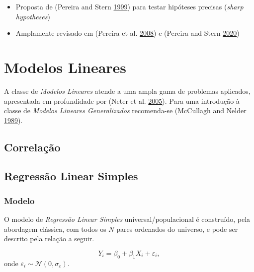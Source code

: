 \documentclass[
]{book}
\providecommand{\tightlist}{%
  \setlength{\itemsep}{0pt}\setlength{\parskip}{0pt}}
\theoremstyle{definition}
\theoremstyle{definition}
\theoremstyle{definition}
\theoremstyle{remark}
\begin{document}
\begin{itemize}
\tightlist
\item
  Proposta de (Pereira and Stern \protect\hyperlink{ref-pereira1999evidence}{1999}) para testar hipóteses precisas (\emph{sharp hypotheses})\\
\item
  Amplamente revisado em (Pereira et al. \protect\hyperlink{ref-pereira2008can}{2008}) e (Pereira and Stern \protect\hyperlink{ref-pereira2020evalue}{2020})
\end{itemize}

\hypertarget{modelos-lineares}{%
\chapter{Modelos Lineares}\label{modelos-lineares}}

A classe de \emph{Modelos Lineares} atende a uma ampla gama de problemas aplicados, apresentada em profundidade por (Neter et al. \protect\hyperlink{ref-neter2005applied}{2005}). Para uma introdução à classe de \emph{Modelos Lineares Generalizados} recomenda-se (McCullagh and Nelder \protect\hyperlink{ref-mccullagh1989generalized}{1989}).

\hypertarget{correlacao}{%
\section{Correlação}\label{correlacao}}

\hypertarget{regressuxe3o-linear-simples}{%
\section{Regressão Linear Simples}\label{regressuxe3o-linear-simples}}

\hypertarget{modelo}{%
\subsection{Modelo}\label{modelo}}

O modelo de \emph{Regressão Linear Simples} universal/populacional é construído, pela abordagem clássica, com todos os \(N\) pares ordenados do universo, e pode ser descrito pela relação a seguir.

\begin{equation}
Y_i = \beta_0 + \beta_1 X_i + \varepsilon_i,
\label{eq:rls}
\end{equation}
onde \(\varepsilon_i \sim \mathcal{N}(0,\sigma_{\varepsilon})\).
\end{document}
